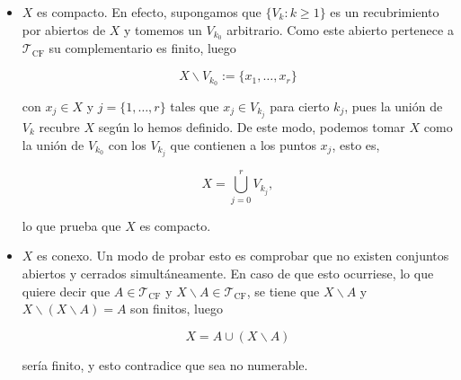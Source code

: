 \begin{itemize}
\item $X$ es compacto. En efecto, supongamos que $\{V_k : k \geq 1\}$ es un recubrimiento por abiertos de $X$ y tomemos un $V_{k_0}$ arbitrario. Como este abierto pertenece a $\mathcal{T}_{\text{CF}}$ su complementario es finito, luego 

\[X \backslash V_{k_0} := \{x_1, \ldots, x_r\}\]

con $x_j \in X$ y $j=\{1,\ldots, r\}$ tales que $x_j\in V_{k_j}$ para cierto $k_j$, pues la unión de $V_k$ recubre $X$ según lo hemos definido. De este modo, podemos tomar $X$ como la unión de $V_{k_0}$ con los $V_{k_j}$ que contienen a los puntos $x_j$, esto es,

\[X=\bigcup_{j=0}^r V_{k_j},\]

lo que prueba que $X$ es compacto. 

\item $X$ es conexo. Un modo de probar esto es comprobar que no existen conjuntos abiertos y cerrados simultáneamente. En caso de que esto ocurriese, lo que quiere decir que $A\in \mathcal{T}_{\text{CF}}$ y $X\backslash A \in \mathcal{T}_{\text{CF}}$, se tiene que $X \backslash A$ y $X\backslash (X\backslash A)=A$ son finitos, luego

\[X=A \cup (X\backslash A)\]

sería finito, y esto contradice que sea no numerable. 
\end{itemize}
